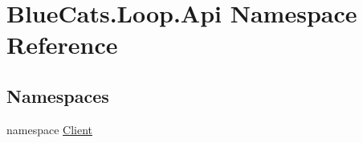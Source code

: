 \hypertarget{namespace_blue_cats_1_1_loop_1_1_api}{}\section{Blue\+Cats.\+Loop.\+Api Namespace Reference}
\label{namespace_blue_cats_1_1_loop_1_1_api}
\subsection*{Namespaces}
\begin{DoxyCompactItemize}
\item 
namespace \mbox{\hyperlink{namespace_blue_cats_1_1_loop_1_1_api_1_1_client}{Client}}
\end{DoxyCompactItemize}
